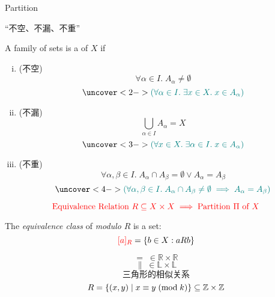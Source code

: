 \begin{frame}{}
  \centerline{\LARGE Partition}

  \vspace{0.60cm}

  \begin{center}
    ``不空、不漏、不重''
  \end{center}
\end{frame}

\begin{frame}{}
  \begin{definition}[划分 (Partition)]
    A family of sets 
    is a  of $X$ if

    \begin{enumerate}[(i)]
      \item (不空)
        \[
          \forall \alpha \in I.\; A_{\alpha} \neq \emptyset
        \]
        \[
          \uncover<2->{\teal{(\forall \alpha \in I.\; \exists x \in X.\; x \in A_{\alpha})}}
        \]
      \item (不漏)
        \[
          \bigcup_{\alpha \in I} A_{\alpha} = X
        \]
        \[
          \uncover<3->{\teal{(\forall x \in X.\; \exists \alpha \in I.\; x \in A_{\alpha})}}
        \]
      \item (不重)
        \[
          \forall \alpha, \beta \in I.\; A_{\alpha} \cap A_{\beta} = \emptyset \lor A_{\alpha} = A_{\beta}
        \]
        \[
          \uncover<4->{\teal{(\forall \alpha, \beta \in I.\; A_{\alpha} \cap A_{\beta} \neq \emptyset \implies A_{\alpha} = A_{\beta})}}
        \]
    \end{enumerate}
  \end{definition}
\end{frame}

\begin{frame}{}
  \[
    \textcolor{red}{\text{Equivalence Relation } R \subseteq X \times X \implies \text{Partition } \Pi \text{ of } X}
  \]

  \pause
  \begin{definition}
    The {\it equivalence class} of  {\it modulo} $R$ is a set:
    \[
      \textcolor{red}{[a]_{R}} = \{b \in X: a R b\}
    \]
  \end{definition}
  \pause
  \[
    =\; \in \mathbb{R} \times \mathbb{R}
  \]
  \pause
  \[
    \parallel\; \in \mathbb{L} \times \mathbb{L}
  \]
  \pause
  \[
    \text{三角形的相似关系}
  \]
  \pause
  \[
    R = \{(x, y) \mid x \equiv y \;(\text{mod}\; k)\}
      \subseteq \mathbb{Z} \times \mathbb{Z}
  \]
\end{frame}

